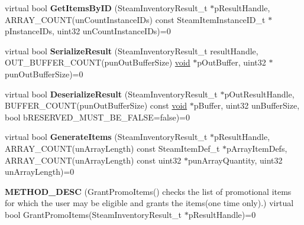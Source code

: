 \begin{DoxyCompactItemize}
\item 
\hypertarget{classISteamInventory_aa4b1ae2e6c436e0524aad80556195389}{}virtual bool {\bfseries Get\+Items\+By\+I\+D} (Steam\+Inventory\+Result\+\_\+t $\ast$p\+Result\+Handle, A\+R\+R\+A\+Y\+\_\+\+C\+O\+U\+N\+T(un\+Count\+Instance\+I\+Ds) const Steam\+Item\+Instance\+I\+D\+\_\+t $\ast$p\+Instance\+I\+Ds, uint32 un\+Count\+Instance\+I\+Ds)=0\label{classISteamInventory_aa4b1ae2e6c436e0524aad80556195389}

\item 
\hypertarget{classISteamInventory_a5d58eca15c7a41b277a5c08bb59534a6}{}virtual bool {\bfseries Serialize\+Result} (Steam\+Inventory\+Result\+\_\+t result\+Handle, O\+U\+T\+\_\+\+B\+U\+F\+F\+E\+R\+\_\+\+C\+O\+U\+N\+T(pun\+Out\+Buffer\+Size) \hyperlink{SDL__audio_8h_a52835ae37c4bb905b903cbaf5d04b05f}{void} $\ast$p\+Out\+Buffer, uint32 $\ast$pun\+Out\+Buffer\+Size)=0\label{classISteamInventory_a5d58eca15c7a41b277a5c08bb59534a6}

\item 
\hypertarget{classISteamInventory_a678f007cac45a1683f2916881dabf9cb}{}virtual bool {\bfseries Deserialize\+Result} (Steam\+Inventory\+Result\+\_\+t $\ast$p\+Out\+Result\+Handle, B\+U\+F\+F\+E\+R\+\_\+\+C\+O\+U\+N\+T(pun\+Out\+Buffer\+Size) const \hyperlink{SDL__audio_8h_a52835ae37c4bb905b903cbaf5d04b05f}{void} $\ast$p\+Buffer, uint32 un\+Buffer\+Size, bool b\+R\+E\+S\+E\+R\+V\+E\+D\+\_\+\+M\+U\+S\+T\+\_\+\+B\+E\+\_\+\+F\+A\+L\+S\+E=false)=0\label{classISteamInventory_a678f007cac45a1683f2916881dabf9cb}

\item 
\hypertarget{classISteamInventory_a9acdb37fd35757ad54105f8766557868}{}virtual bool {\bfseries Generate\+Items} (Steam\+Inventory\+Result\+\_\+t $\ast$p\+Result\+Handle, A\+R\+R\+A\+Y\+\_\+\+C\+O\+U\+N\+T(un\+Array\+Length) const Steam\+Item\+Def\+\_\+t $\ast$p\+Array\+Item\+Defs, A\+R\+R\+A\+Y\+\_\+\+C\+O\+U\+N\+T(un\+Array\+Length) const uint32 $\ast$pun\+Array\+Quantity, uint32 un\+Array\+Length)=0\label{classISteamInventory_a9acdb37fd35757ad54105f8766557868}

\item 
\hypertarget{classISteamInventory_a41e365e48e9c3f1a01737d9d10fc974f}{}{\bfseries M\+E\+T\+H\+O\+D\+\_\+\+D\+E\+S\+C} (Grant\+Promo\+Items() checks the list of promotional items for which the user may be eligible and grants the items(one time only).) virtual bool Grant\+Promo\+Items(Steam\+Inventory\+Result\+\_\+t $\ast$p\+Result\+Handle)=0\label{classISteamInventory_a41e365e48e9c3f1a01737d9d10fc974f}


\end{DoxyCompactItemize}
